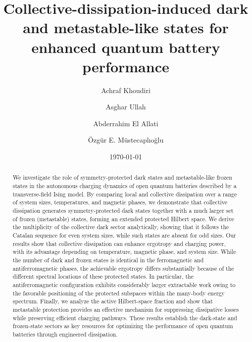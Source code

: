 \documentclass[aps,superscriptaddress,twocolumn,pre,longbibliography,floatfix]{revtex4-1}
\begin{document}
	\title{Collective-dissipation-induced dark and metastable-like states for enhanced quantum battery performance}
	\author{Achraf Khoudiri}
	\author{Asghar Ullah}
	
	\author{Abderrahim El Allati}
	
	\author{\"Ozg\"ur E. M\"ustecapl\i o\u glu}	
	\date{\today}
	
	\begin{abstract}
		We investigate the role of symmetry-protected dark states and metastable-like frozen states in the autonomous charging dynamics of open quantum batteries described by a transverse-field Ising model. By comparing local and collective dissipation over a range of system sizes, temperatures, and magnetic phases, we demonstrate that collective dissipation generates symmetry-protected dark states together with a much larger set of frozen (metastable) states, forming an extended protected Hilbert space. 
		We derive the multiplicity of the collective dark sector analytically, showing that it follows the Catalan sequence for even system sizes, while such states are absent for odd sizes. Our results show that collective dissipation can enhance ergotropy and charging power, with its advantage depending on temperature, magnetic phase, and system size. While the number of dark and frozen states is identical in the ferromagnetic and antiferromagnetic phases, the achievable ergotropy differs substantially because of the different spectral locations of these protected states. 
		In particular, the antiferromagnetic configuration exhibits considerably larger extractable work owing to the favorable positioning of the protected subspaces within the many-body energy spectrum. Finally, we analyze the active Hilbert-space fraction and show that metastable protection provides an effective mechanism for suppressing dissipative losses while preserving efficient charging pathways. These results establish the dark-state and frozen-state sectors as key resources for optimizing the performance of open quantum batteries through engineered dissipation.
		
	\end{abstract}
	
\end{document}
